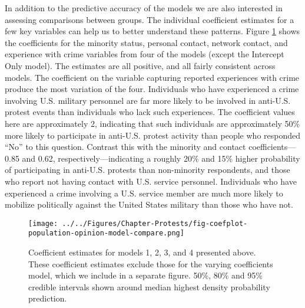 In addition to the predictive accuracy of the models we are also interested in assessing comparisons between groups. The individual coefficient estimates for a few key variables can help us to better understand these patterns. Figure \ref{fig:coefplot-population-compare} shows the coefficients for the minority status, personal contact, network contact, and experience with crime variables from four of the models (except the Intercept Only model). The estimates are all positive, and all fairly consistent across models. The coefficient on the variable capturing reported experiences with crime produce the most variation of the four. Individuals who have experienced a crime involving U.S. military personnel are far more likely to be involved in anti-U.S. protest events than individuals who lack such experiences. The coefficient values here are approximately 2, indicating that such individuals are approximately 50\% more likely to participate in anti-U.S. protest activity than people who responded ``No'' to this question. Contrast this with the minority and contact coefficients---0.85 and 0.62, respectively---indicating a roughly 20\% and 15\% higher probability of participating in anti-U.S. protests than non-minority respondents, and those who report not having contact with U.S. service personnel. Individuals who have experienced a crime involving a U.S. service member are much more likely to mobilize politically against the United States military than those who have not. 


\begin{figure}[t]
	\centering\texttt{[image: ../../Figures/Chapter-Protests/fig-coefplot-population-opinion-model-compare.png]}
	\caption{Coefficient estimates for models 1, 2, 3, and 4 presented above. These coefficient estimates exclude those for the varying coefficients model, which we include in a separate figure. 50\%, 80\% and 95\% credible intervals shown around median highest density probability prediction.}
	\label{fig:coefplot-population-compare}
\end{figure}

